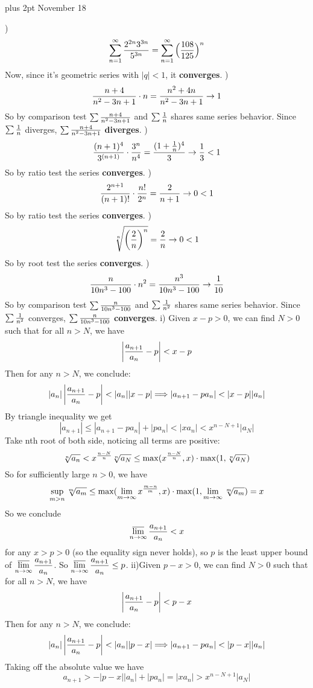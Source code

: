 
\mydoc
\baselineskip 16pt plus 2pt
 November {18}
%

) $$\sum_{n=1}^{\infty}{2^{2n}3^{3n}\over5^{3n}}=\sum_{n=1}^{\infty}\Big({108\over125}\Big)^n$$
Now, since it's geometric series with $|q|<1$, it {\bf converges}.
\medskip
{}) $$ {n+4\over n^2-3n+1}\cdot n={n^2+4n\over n^2-3n+1}\to 1$$
So by comparison test $\sum{n+4\over n^2-3n+1}$ and  $\sum{1\over n}$ shares same series behavior. Since  $\sum{1\over n}$ diverges, $\sum{n+4\over n^2-3n+1}$ {\bf diverges}.
\medskip
{}) $$ {(n+1)^4\over 3^{(n+1)}}\cdot{3^n\over n^4}={(1+{1\over n})^4\over 3}\to{1\over3}<1$$
So by ratio test the series {\bf converges}.
\medskip
{}) $${2^{n+1}\over (n+1)!}\cdot{n!\over2^n}={2\over n+1}\to 0<1$$
So by ratio test the series {\bf converges}.
\medskip
{}) $${ \root n \of {\left(2\over n\right)^n}}={2\over n}\to 0<1$$
So by root test the series {\bf converges}.
\medskip
{}) $$ {n\over 10n^3-100}\cdot n^2={n^3\over10n^3-100}\to{1\over10}$$
So by comparison test $\sum{n\over 10n^3-100}$ and  $\sum{1\over n^2}$ shares same series behavior. Since  $\sum{1\over n^2}$ converges, $\sum{n\over 10n^3-100}$ {\bf converges}.
\bigskip
\noindent i) Given $x-p>0$, we can find $N>0$ such that for all $n>N$, we have
$$
\left|{a_{n+1}\over a_n}-p\right|<x-p
$$
Then for any $n>N$, we conclude:
$$
|a_n|\left|{a_{n+1}\over a_n}-p\right|<|a_n||x-p|\Longrightarrow \left|a_{n+1}-pa_n\right|<|x-p||a_n|
$$
By triangle inequality we get
$$|a_{n+1}|\le\left|a_{n+1}-pa_n\right|+|pa_n|<|xa_n|<x^{n-N+1}|a_N|
$$
Take nth root of both side, noticing all terms are positive:
$$
{\root n \of{ a_{n}}}<x^{n-N\over n}{\root n \of {a_N}}\le\max(x^{n-N\over n},x)\cdot \max(1,{\root n \of {a_N}})
$$
So for sufficiently large $n>0$, we have
$$
\sup_{m>n}\root m \of {a_m}\le\max(\lim_{m\to \infty}x^{m-n\over m},x)\cdot \max(1,\lim_{m\to \infty}{\root m \of {a_m}})=x
$$
So we conclude 
$$
\varlimsup_{n\to\infty}{a_{n+1}\over a_n}<x
$$
for any $x>p>0$ (so the equality sign never holds), so $p$ is the least upper bound of $\displaystyle\varlimsup_{n\to\infty}{a_{n+1}\over a_n}$. So $\displaystyle\varlimsup_{n\to\infty}{a_{n+1}\over a_n}\le p$.
\medskip
\noindent ii)Given $p-x>0$, we can find $N>0$ such that for all $n>N$, we have
$$
\left|{a_{n+1}\over a_n}-p\right|<p-x
$$
Then for any $n>N$, we conclude:
$$
|a_n|\left|{a_{n+1}\over a_n}-p\right|<|a_n||p-x|\Longrightarrow \left|a_{n+1}-pa_n\right|<|p-x||a_n|
$$
Taking off the absolute value we have
$$a_{n+1}>-|p-x||a_n|+|pa_n|=|xa_n|>x^{n-N+1}|a_N|
$$
